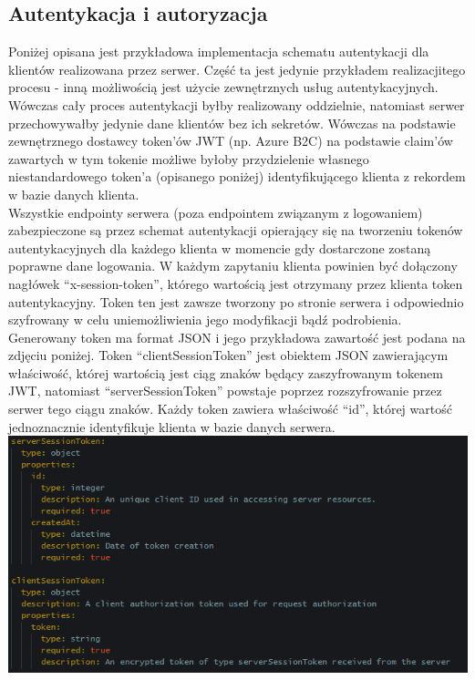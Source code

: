 \documentclass{article}
\begin{document}
\subsection{Autentykacja i autoryzacja}
\indent \indent Poniżej opisana jest przykładowa implementacja schematu autentykacji dla klientów realizowana przez serwer. Część ta jest jedynie przykładem realizacjitego procesu - inną możliwością jest użycie zewnętrznych usług autentykacyjnych. Wówczas cały proces autentykacji byłby realizowany oddzielnie, natomiast serwer przechowywałby jedynie dane klientów bez ich sekretów. Wówczas na podstawie zewnętrznego dostawcy token'ów JWT (np. Azure B2C) na podstawie claim'ów zawartych w tym tokenie możliwe byłoby przydzielenie własnego niestandardowego token'a (opisanego poniżej) identyfikującego klienta z rekordem w bazie danych klienta.\\
\indent Wszystkie endpointy serwera (poza endpointem związanym z logowaniem) zabezpieczone są przez schemat autentykacji opierający się na tworzeniu tokenów autentykacyjnych dla każdego klienta w momencie gdy dostarczone zostaną poprawne dane logowania. W każdym zapytaniu klienta powinien być dołączony nagłówek “x-session-token”, którego wartością jest otrzymany przez klienta token autentykacyjny. Token ten jest zawsze tworzony po stronie serwera i odpowiednio szyfrowany w celu uniemożliwienia jego modyfikacji bądź podrobienia. Generowany token ma format JSON i jego przykładowa zawartość jest podana na zdjęciu poniżej. Token “clientSessionToken” jest obiektem JSON zawierającym właściwość, której wartością jest ciąg znaków będący zaszyfrowanym tokenem JWT, natomiast “serverSessionToken” powstaje poprzez rozszyfrowanie przez serwer tego ciągu znaków. Każdy token zawiera właściwość “id”, której wartość jednoznacznie identyfikuje klienta w bazie danych serwera.
\newline
\includegraphics[width=\linewidth]{Client login + authentication/authentication_tokens.png}
\end{document}
